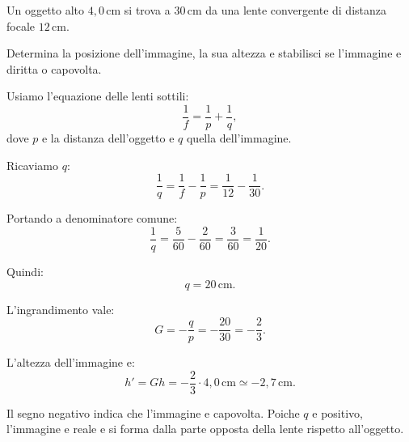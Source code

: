 
\begin{esercizio}
Un oggetto alto \(4{,}0\,\mathrm{cm}\) si trova a \(30\,\mathrm{cm}\) da
una lente convergente di distanza focale \(12\,\mathrm{cm}\).

Determina la posizione dell'immagine, la sua altezza e stabilisci se
l'immagine e diritta o capovolta.
\end{esercizio}

\begin{soluzione}
Usiamo l'equazione delle lenti sottili:
\[
\frac{1}{f}=\frac{1}{p}+\frac{1}{q},
\]
dove \(p\) e la distanza dell'oggetto e \(q\) quella dell'immagine.

Ricaviamo \(q\):
\[
\frac{1}{q}=\frac{1}{f}-\frac{1}{p}
=\frac{1}{12}-\frac{1}{30}.
\]

Portando a denominatore comune:
\[
\frac{1}{q}=\frac{5}{60}-\frac{2}{60}
=\frac{3}{60}
=\frac{1}{20}.
\]

Quindi:
\[
q=20\,\mathrm{cm}.
\]

L'ingrandimento vale:
\[
G=-\frac{q}{p}=-\frac{20}{30}=-\frac{2}{3}.
\]

L'altezza dell'immagine e:
\[
h'=Gh=-\frac{2}{3}\cdot 4{,}0\,\mathrm{cm}
\simeq -2{,}7\,\mathrm{cm}.
\]

Il segno negativo indica che l'immagine e capovolta. Poiche \(q\) e positivo,
l'immagine e reale e si forma dalla parte opposta della lente rispetto
all'oggetto.
\end{soluzione}
